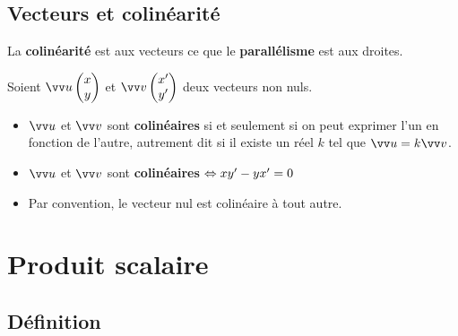 \documentclass[a4paper,11pt]{article}
\begin{document}
\subsection{Vecteurs et colinéarité}

\begin{cdefi}
La \textbf{colinéarité} est aux vecteurs ce que le \textbf{parallélisme} est aux droites.
\end{cdefi}

\begin{cthm}
Soient $\coord{u}{x}{y}$ et $\coord{v}{x'}{y'} $ deux vecteurs non nuls.
\begin{itemize}
	\item $\vect{u}$ et $\vect{v}$ sont \textbf{colinéaires} si et seulement si on peut exprimer l'un en fonction de l'autre, autrement  dit si il existe un réel $k$ tel que $\vect{u}=k \vect{v} $.
	\item $\vect{u}$ et $\vect{v}$ sont \textbf{colinéaires} $\Leftrightarrow xy'-yx'=0$
	\item Par convention, le vecteur nul est colinéaire à tout autre.
\end{itemize}
\end{cthm}

\section{Produit scalaire}

\subsection{Définition}
\end{document}
